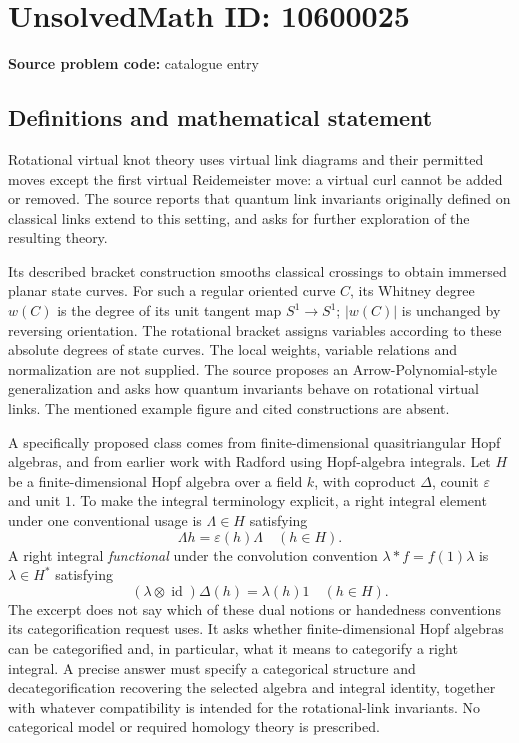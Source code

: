 \documentclass[11pt]{article}
\begin{document}
\section*{UnsolvedMath ID: 10600025}
\textbf{Source problem code:} catalogue entry
\subsection{Definitions and mathematical statement}
Rotational virtual knot theory uses virtual link diagrams and their permitted moves except the first virtual Reidemeister move: a virtual curl cannot be added or removed. The source reports that quantum link invariants originally defined on classical links extend to this setting, and asks for further exploration of the resulting theory.

Its described bracket construction smooths classical crossings to obtain immersed planar state curves. For such a regular oriented curve \(C\), its Whitney degree \(w(C)\) is the degree of its unit tangent map \(S^1\to S^1\); \(|w(C)|\) is unchanged by reversing orientation. The rotational bracket assigns variables according to these absolute degrees of state curves. The local weights, variable relations and normalization are not supplied. The source proposes an Arrow-Polynomial-style generalization and asks how quantum invariants behave on rotational virtual links. The mentioned example figure and cited constructions are absent.

A specifically proposed class comes from finite-dimensional quasitriangular Hopf algebras, and from earlier work with Radford using Hopf-algebra integrals. Let \(H\) be a finite-dimensional Hopf algebra over a field \(k\), with coproduct \(\Delta\), counit \(\varepsilon\) and unit \(1\). To make the integral terminology explicit, a right integral element under one conventional usage is \(\Lambda\in H\) satisfying
\[\Lambda h=\varepsilon(h)\Lambda\quad(h\in H).\]
A right integral \emph{functional} under the convolution convention \(\lambda*f=f(1)\lambda\) is \(\lambda\in H^*\) satisfying
\[(\lambda\otimes\operatorname{id})\Delta(h)=\lambda(h)1\quad(h\in H).\]
The excerpt does not say which of these dual notions or handedness conventions its categorification request uses. It asks whether finite-dimensional Hopf algebras can be categorified and, in particular, what it means to categorify a right integral. A precise answer must specify a categorical structure and decategorification recovering the selected algebra and integral identity, together with whatever compatibility is intended for the rotational-link invariants. No categorical model or required homology theory is prescribed.
\end{document}
